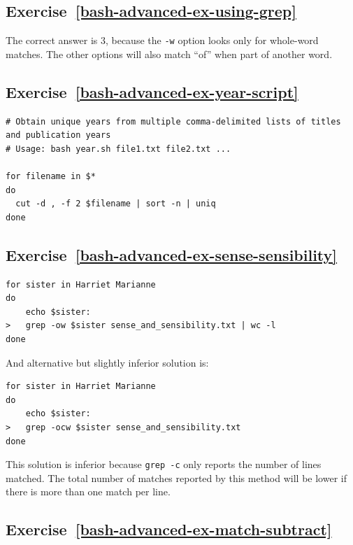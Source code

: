 \documentclass[
]{krantz}
\begin{document}
\hypertarget{exercise-refbash-advanced-ex-using-grep}{%
\subsection*{Exercise~\ref{bash-advanced-ex-using-grep}}\label{exercise-refbash-advanced-ex-using-grep}}


The correct answer is 3, because the \texttt{-w} option looks only for whole-word matches.
The other options will also match ``of'' when part of another word.

\hypertarget{exercise-refbash-advanced-ex-year-script}{%
\subsection*{Exercise~\ref{bash-advanced-ex-year-script}}\label{exercise-refbash-advanced-ex-year-script}}


\begin{verbatim}
# Obtain unique years from multiple comma-delimited lists of titles and publication years
# Usage: bash year.sh file1.txt file2.txt ...

for filename in $*
do
  cut -d , -f 2 $filename | sort -n | uniq
done
\end{verbatim}

\hypertarget{exercise-refbash-advanced-ex-sense-sensibility}{%
\subsection*{Exercise~\ref{bash-advanced-ex-sense-sensibility}}\label{exercise-refbash-advanced-ex-sense-sensibility}}


\begin{verbatim}
for sister in Harriet Marianne
do
    echo $sister:
>   grep -ow $sister sense_and_sensibility.txt | wc -l
done
\end{verbatim}

And alternative but slightly inferior solution is:

\begin{verbatim}
for sister in Harriet Marianne
do
    echo $sister:
>   grep -ocw $sister sense_and_sensibility.txt
done
\end{verbatim}

This solution is inferior because \texttt{grep\ -c} only reports the number of lines matched.
The total number of matches reported by this method
will be lower if there is more than one match per line.

\hypertarget{exercise-refbash-advanced-ex-match-subtract}{%
\subsection*{Exercise~\ref{bash-advanced-ex-match-subtract}}\label{exercise-refbash-advanced-ex-match-subtract}}
\end{document}
